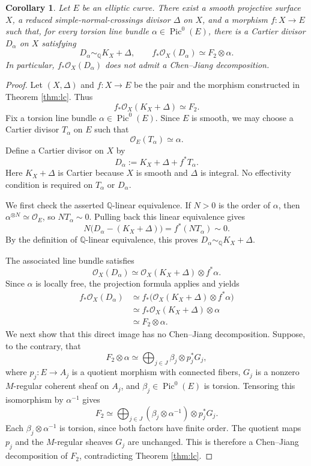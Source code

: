 \documentclass[10pt,a4paper]{amsart}
\newtheorem{corollary}[theorem]{Corollary}
\newcommand{\OO}{\mathcal O}
\newcommand{\QQ}{\mathbb Q}
\newcommand{\simQ}{\sim_{\QQ}}
\DeclareMathOperator{\Pic}{Pic}
\begin{document}
\begin{corollary}\label{cor:torsion}
Let $E$ be an elliptic curve. There exist a smooth projective surface $X$, a reduced simple-normal-crossings divisor $\Delta$ on $X$, and a morphism $f:X\to E$ such that, for every torsion line bundle $\alpha\in\Pic^0(E)$, there is a Cartier divisor $D_\alpha$ on $X$ satisfying
\[
D_\alpha\simQ K_X+\Delta,\qquad f_*\OO_X(D_\alpha)\simeq F_2\otimes\alpha.
\]
In particular, $f_*\OO_X(D_\alpha)$ does not admit a Chen--Jiang decomposition.
\end{corollary}
\begin{proof}
Let $(X,\Delta)$ and $f:X\to E$ be the pair and the morphism constructed in Theorem \ref{thm:lc}. Thus
\[
f_*\OO_X(K_X+\Delta)\simeq F_2.
\]
Fix a torsion line bundle $\alpha\in\Pic^0(E)$. Since $E$ is smooth, we may choose a Cartier divisor $T_\alpha$ on $E$ such that
\[
\OO_E(T_\alpha)\simeq\alpha.
\]
Define a Cartier divisor on $X$ by
\[
D_\alpha:=K_X+\Delta+f^*T_\alpha.
\]
Here $K_X+\Delta$ is Cartier because $X$ is smooth and $\Delta$ is integral. No effectivity condition is required on $T_\alpha$ or $D_\alpha$.

We first check the asserted $\QQ$-linear equivalence. If $N>0$ is the order of $\alpha$, then $\alpha^{\otimes N}\simeq\OO_E$, so $NT_\alpha\sim0$. Pulling back this linear equivalence gives
\[
N\bigl(D_\alpha-(K_X+\Delta)\bigr)=f^*(NT_\alpha)\sim0.
\]
By the definition of $\QQ$-linear equivalence, this proves $D_\alpha\simQ K_X+\Delta$.

The associated line bundle satisfies
\[
\OO_X(D_\alpha)\simeq\OO_X(K_X+\Delta)\otimes f^*\alpha.
\]
Since $\alpha$ is locally free, the projection formula applies and yields
\begin{align*}
f_*\OO_X(D_\alpha)
&\simeq f_*\bigl(\OO_X(K_X+\Delta)\otimes f^*\alpha\bigr)\\
&\simeq f_*\OO_X(K_X+\Delta)\otimes\alpha\\
&\simeq F_2\otimes\alpha.
\end{align*}
We next show that this direct image has no Chen--Jiang decomposition. Suppose, to the contrary, that
\[
F_2\otimes\alpha\simeq\bigoplus_{j\in J}\beta_j\otimes p_j^*G_j,
\]
where $p_j:E\to A_j$ is a quotient morphism with connected fibers, $G_j$ is a nonzero $M$-regular coherent sheaf on $A_j$, and $\beta_j\in\Pic^0(E)$ is torsion. Tensoring this isomorphism by $\alpha^{-1}$ gives
\[
F_2\simeq\bigoplus_{j\in J}(\beta_j\otimes\alpha^{-1})\otimes p_j^*G_j.
\]
Each $\beta_j\otimes\alpha^{-1}$ is torsion, since both factors have finite order. The quotient maps $p_j$ and the $M$-regular sheaves $G_j$ are unchanged. This is therefore a Chen--Jiang decomposition of $F_2$, contradicting Theorem \ref{thm:lc}.
\end{proof}
\end{document}
